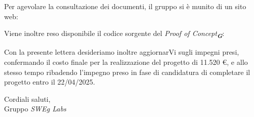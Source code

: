 Per agevolare la consultazione dei documenti, il gruppo si è munito di un sito web:
\begin{center}
\end{center}
Viene inoltre reso disponibile il codice sorgente del \emph{Proof of Concept}\textsubscript{\textit{\textbf{G}}}: 
\begin{center}
\end{center}
Con la presente lettera desideriamo inoltre aggiornarVi sugli impegni presi, confermando il costo finale per la realizzazione del progetto di 11.520 \euro, e allo stesso tempo ribadendo l’impegno preso in fase di candidatura di completare il progetto entro il 22/04/2025.\\
\vspace{1.5cm}

Cordiali saluti,\\
Gruppo \emph{SWEg Labs}

